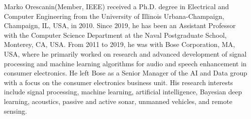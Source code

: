 \documentclass[journal]{IEEEtran} %
\begin{document}
\begin{IEEEbiography}
{Marko Orescanin}(Member, IEEE) received a Ph.D. degree in Electrical and Computer Engineering from the University of Illinois Urbana-Champaign, Champaign, IL, USA, in 2010.
Since 2019, he has been an Assistant Professor with the Computer Science Department at the Naval Postgraduate School, Monterey, CA, USA. From 2011 to 2019, he was with Bose Corporation, MA, USA, where he primarily worked on research and advanced development of signal processing and machine learning algorithms for audio and speech enhancement in consumer electronics. He left Bose as a Senior Manager of the AI and Data group with a focus on the consumer electronics business unit. His research interests include signal processing, machine learning, artificial intelligence, Bayesian deep learning, acoustics, passive and active sonar, unmanned vehicles, and remote sensing.
\end{IEEEbiography}
\end{document}
